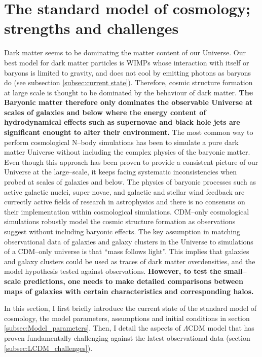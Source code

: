 \documentclass[paper=a4, fontsize=11pt]{scrartcl} %
\numberwithin{equation}{section} %
\numberwithin{figure}{section} %
\numberwithin{table}{section} %
\begin{document}
\section{The standard model of cosmology; strengths and challenges}
\label{sec:LCDM}
Dark matter seems to be dominating the matter content of our Universe. Our best model for dark matter particles is WIMPs whose interaction with itself or baryons is limited to gravity, and does not cool by emitting photons as baryons do (see subsection \ref{subsec:current state}). Therefore, cosmic structure formation at large scale is thought to be dominated by the behaviour of dark matter. {\bf The Baryonic matter therefore only dominates the observable Universe at scales of galaxies and below where the energy content of hydrodynamical effects such as supernovae and black hole jets are significant enought to alter their environment.} The most common way to perform cosmological N--body simulations has been to simulate a pure dark matter Universe without including the complex physics of the baryonic matter. Even though this approach has been proven to provide a consistent picture of our Universe at the large--scale, it keeps facing systematic inconsistencies when probed at scales of galaxies and below. The physics of baryonic processes such as active galactic nuclei, super novae, and galactic and stellar wind feedback are currectly active fields of research in astrophysics and there is no consensus on their implementation within cosmological simulations. CDM--only cosmological simulations robustly model the cosmic structure formation as observations suggest without including baryonic effects. The key assumption in matching observational data of galaxies and galaxy clusters in the Universe to simulations of a CDM--only universe is that ``mass follows light''. This implies that galaxies and galaxy clusters could be used as traces of dark matter overdensities, and the model hypothesis tested against observations. {\bf However, to test the small--scale predictions, one needs to make detailed comparisons between maps of galaxies with certain characteristics and corresponding halos.}

In this section, I first briefly introduce the current state of the standard model of cosmology, the model parameters, assumptions and initial conditions in  section \ref{subsec:Model_parameters}. Then, I detail the aspects of $\Lambda$CDM model that has proven fundamentally challenging against the latest observational data (section \ref{subsec:LCDM_challenges}).
\end{document}
